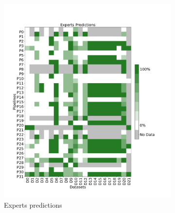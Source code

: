 \documentclass[conference]{IEEEtran}
\begin{document}
\begin{figure}
\centering
\begin{subfigure}{.49\textwidth}  \includegraphics[width=\columnwidth]{figures/Commented Success Percentage.pdf}
  \caption{Experts predictions}
  \label{fig:experts_matrix}
\end{subfigure} \hfill
\begin{subfigure}{.49\textwidth}

\end{subfigure}
\end{figure}
\end{document}
